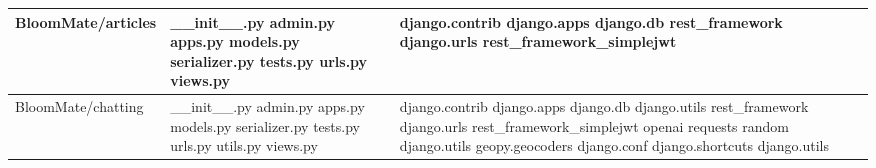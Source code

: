 \documentclass[conference, a4paper]{IEEEtran}
\begin{document}
\begin{table} [htp]
\begin{tabular}{p{1.7cm}|p{2.8cm}|p{2.5cm}}
 \hline
 BloomMate\newline/articles & \_\_init\_\_.py \newline admin.py \newline apps.py \newline models.py \newline serializer.py \newline tests.py \newline urls.py \newline views.py & django.contrib  \newline 
django.apps \newline django.db \newline rest\_framework \newline django.urls \newline rest\_framework\_simplejwt \\
 \hline
 BloomMate\newline /chatting & \_\_init\_\_.py \newline admin.py \newline apps.py \newline models.py \newline serializer.py \newline tests.py \newline urls.py \newline utils.py \newline views.py &  django.contrib \newline django.apps \newline django.db \newline django.utils \newline rest\_framework \newline django.urls \newline rest\_framework\_simplejwt \newline openai \newline requests
\newline random \newline django.utils \newline geopy.geocoders \newline django.conf \newline django.shortcuts \newline django.utils \\
\hline
    \end{tabular}
\end{table}

\newpage 
\end{document}
